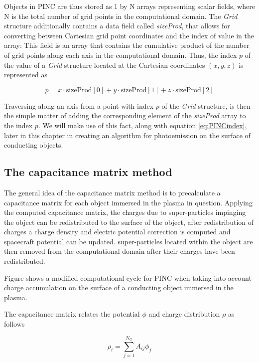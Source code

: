Objects in PINC are thus stored as 1 by N arrays representing scalar fields, where N is the total number of grid points in the computational domain. The \textit{Grid} structure additionally contains a data field called \textit{sizeProd}, that allows for converting between Cartesian grid point coordinates and the index of value in the array: This field is an array that contains the cumulative product of the number of grid points along each axis in the computational domain. Thus, the index $p$ of the value of a \textit{Grid} structure located at the Cartesian coordinates $(x,y,z)$ is represented as

\begin{equation}\label{eq:PINCindex}
    p = x \cdot \text{sizeProd}[0] + y \cdot \text{sizeProd}[1] + z \cdot \text{sizeProd}[2]
\end{equation}

Traversing along an axis from a point with index $p$ of the \textit{Grid} structure, is then the simple matter of adding the corresponding element of the \textit{sizeProd} array to the index $p$. We will make use of this fact, along with equation \eqref{eq:PINCindex}, later in this chapter in creating an algorithm for photoemission on the surface of conducting objects. 


\subsection{The capacitance matrix method}
The general idea of the capacitance matrix method is to precalculate a capacitance matrix for each object immersed in the plasma in question. Applying the computed capacitance matrix, the charges due to super-particles impinging the object can be redistributed to the surface of the object, after redistribution of charges a charge density and electric potential correction is computed and spacecraft potential can be updated. super-particles located within the object are then removed from the computational domain after their charges have been redistributed. 

Figure  shows a modified computational cycle for PINC when taking into account charge accumulation on the surface of a conducting object immersed in the plasma.

The capacitance matrix relates the potential $\phi$ and charge distribution $\rho$ as follows \parencite{Miyake2009}

\begin{equation}
    \rho_i = \sum^{N_G}_{j=1} A_{ij} \phi_j
\end{equation}


